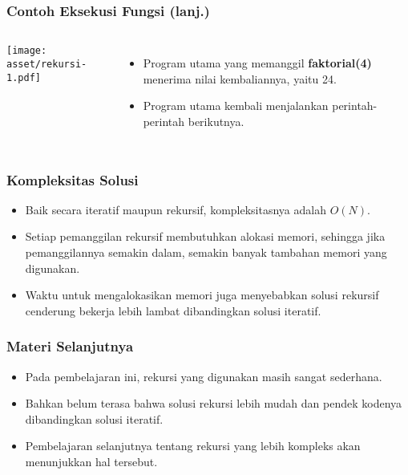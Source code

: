 \begin{frame}
\frametitle{Contoh Eksekusi Fungsi (lanj.)}
\begin{columns}
    \centering
    \texttt{[image: asset/rekursi-1.pdf]}
    \begin{itemize}
      \item Program utama yang memanggil \textbf{faktorial(4)} menerima nilai kembaliannya, yaitu 24.
      \item Program utama kembali menjalankan perintah-perintah berikutnya.
    \end{itemize}
  \end{columns} 
\end{frame}

\begin{frame}
\frametitle{Kompleksitas Solusi}
\begin{itemize}
  \item Baik secara iteratif maupun rekursif, kompleksitasnya adalah $O(N)$.
  \item Setiap pemanggilan rekursif membutuhkan alokasi memori, sehingga jika pemanggilannya semakin dalam, semakin banyak tambahan memori yang digunakan.
  \item Waktu untuk mengalokasikan memori juga menyebabkan solusi rekursif cenderung bekerja lebih lambat dibandingkan solusi iteratif.
\end{itemize}
\end{frame}

\begin{frame}
\frametitle{Materi Selanjutnya}
\begin{itemize}
  \item Pada pembelajaran ini, rekursi yang digunakan masih sangat sederhana.
  \item Bahkan belum terasa bahwa solusi rekursi lebih mudah dan pendek kodenya dibandingkan solusi iteratif.
  \item Pembelajaran selanjutnya tentang rekursi yang lebih kompleks akan menunjukkan hal tersebut.
\end{itemize}
\end{frame}


